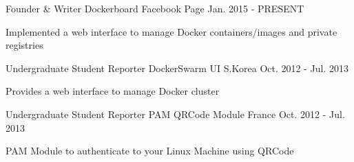 \begin{cventries}
  \cventry
    {Founder \& Writer}
    {Dockerboard}
    {Facebook Page}
    {Jan. 2015 - PRESENT}
    {
      \begin{cvitems}
        \item {Implemented a web interface to manage Docker containers/images and private registries}
      \end{cvitems}
    }
  \cventry
    {Undergraduate Student Reporter}
    {DockerSwarm UI}
    {S.Korea}
    {Oct. 2012 - Jul. 2013}
    {
      \begin{cvitems}
        \item {Provides a web interface to manage Docker cluster}
      \end{cvitems}
    }
    \cventry
    {Undergraduate Student Reporter}
    {PAM QRCode Module}
    {France}
    {Oct. 2012 - Jul. 2013}
    {
      \begin{cvitems}
        \item {PAM Module to authenticate to your Linux Machine using QRCode}
      \end{cvitems}
    }
\end{cventries}
